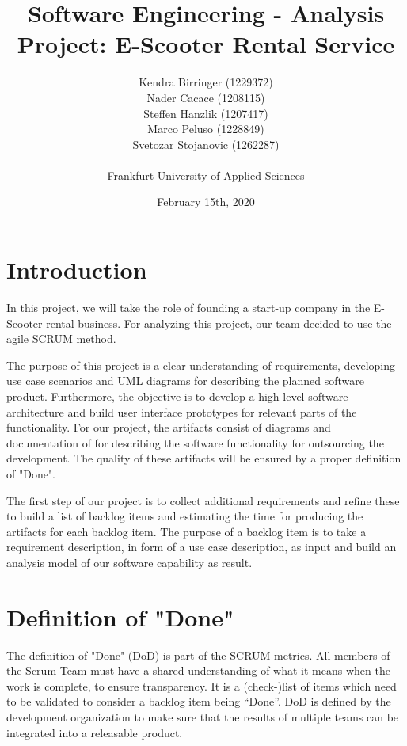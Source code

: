 \documentclass[a4paper, 12pt]{article}
\title{Software Engineering - Analysis\\
Project: E-Scooter Rental Service}
\author{
    Kendra Birringer (1229372)\\
    Nader Cacace (1208115)\\
    Steffen Hanzlik (1207417)\\
    Marco Peluso (1228849)\\
    Svetozar Stojanovic (1262287)\\
    \\
    Frankfurt University of Applied Sciences
}
\date{February 15th, 2020}
\begin{document}
\maketitle
\newpage
\tableofcontents

\newpage
\section{Introduction}
In this project, we will take the role of founding a start-up company in the E-Scooter rental business.
For analyzing this project, our team decided to use the agile SCRUM method.

The purpose of this project is a clear understanding of requirements, developing use case scenarios and UML diagrams for describing the planned software product.
Furthermore, the objective is to develop a high-level software architecture and build user interface prototypes for relevant parts of the functionality.
For our project, the artifacts consist of diagrams and documentation of for describing the software functionality for outsourcing the development. The quality of these artifacts will be ensured by a proper definition of "Done".

The first step of our project is to collect additional requirements and refine these to build a list of backlog items and estimating the time for producing the artifacts for each backlog item. The purpose of a backlog item is to take a requirement description, in form of a use case description, as input and build an analysis model of our software capability as result.

\section{Definition of "Done"}
The definition of "Done" (DoD) is part of the SCRUM metrics. All members of the Scrum Team must have a shared understanding of what it means when the work is complete, to ensure transparency. \cite{scrumguide}
It is a (check-)list of items which need to be validated to consider a backlog item being “Done”. DoD is defined by the development organization to make sure that the results of multiple teams can be integrated into a releasable product.  \cite{thoma1}
\end{document}
